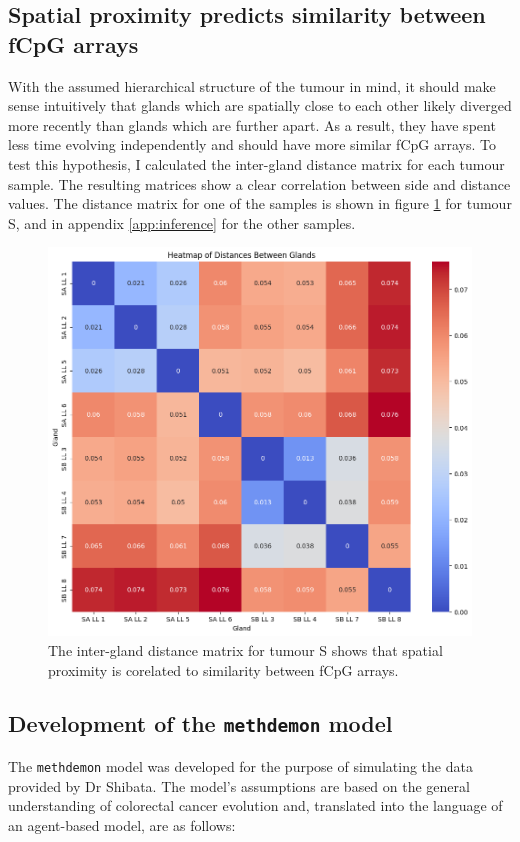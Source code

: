\subsection{Spatial proximity predicts similarity between fCpG arrays}
With the assumed hierarchical structure of the tumour in mind, it should make
sense intuitively that glands which are spatially close to each other likely
diverged more recently than glands which are further apart. As a result, they
have spent less time evolving independently and should have more similar fCpG
arrays. To test this hypothesis, I calculated the inter-gland distance matrix
for each tumour sample. The resulting matrices show a clear correlation between
side and distance values. The distance matrix for one of the samples is shown
in figure \ref{fig:gland_dist_S} for tumour S, and in appendix
\ref{app:inference} for the other samples.

\begin{figure}[h]
    \centering
    \includegraphics[width=\textwidth]{Chapter_5/figures/gland_dist_S.png}
    \caption{The inter-gland distance matrix for tumour S shows that spatial
    proximity is corelated to similarity between fCpG arrays.}
    \label{fig:gland_dist_S}
\end{figure}

\subsection{Development of the \texttt{methdemon} model}
The \texttt{methdemon} model was developed for the purpose of simulating the
data provided by Dr Shibata. The model's assumptions are based on the general
understanding of colorectal cancer evolution and, translated into the language
of an agent-based model, are as follows:

